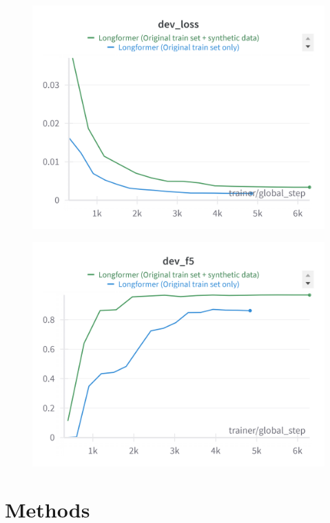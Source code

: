 \documentclass[11pt]{article}
\begin{document}
\begin{figure}[H]
  \centering
  \includegraphics[width=\columnwidth]{images/dev_loss.png}
  \label{fig:dev_loss}
\end{figure}

\begin{figure}[H]
  \centering
  \includegraphics[width=\columnwidth]{images/dev_f5.png}
  \label{fig:dev_f5}
\end{figure}

\section{Methods}
\end{document}
